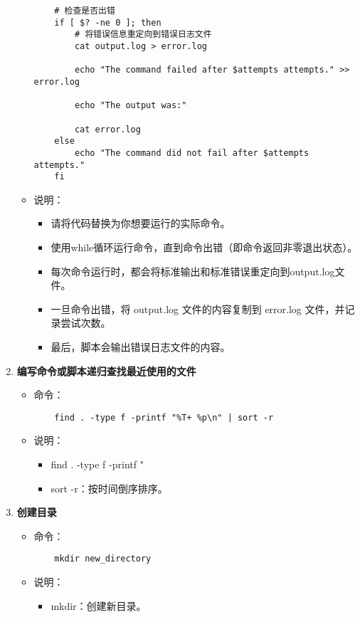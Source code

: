 \documentclass[UTF8]{ctexart}
\begin{document}
\begin{enumerate}
\begin{itemize}
\begin{verbatim}
    # 检查是否出错
    if [ $? -ne 0 ]; then
        # 将错误信息重定向到错误日志文件
        cat output.log > error.log

        echo "The command failed after $attempts attempts." >> error.log

        echo "The output was:"

        cat error.log
    else
        echo "The command did not fail after $attempts attempts."
    fi
    \end{verbatim}
    \item 说明：
    \begin{itemize}
      \item 请将代码替换为你想要运行的实际命令。
      \item 使用while循环运行命令，直到命令出错（即命令返回非零退出状态）。
      \item 每次命令运行时，都会将标准输出和标准错误重定向到output.log文件。
      \item 一旦命令出错，将 output.log 文件的内容复制到 error.log 文件，并记录尝试次数。
      \item 最后，脚本会输出错误日志文件的内容。
    \end{itemize}
  \end{itemize}

  \item \textbf{编写命令或脚本递归查找最近使用的文件}
  \begin{itemize}
    \item 命令：
    \begin{verbatim}
    find . -type f -printf "%T+ %p\n" | sort -r
    \end{verbatim}
    \item 说明：
    \begin{itemize}
      \item find . -type f -printf "%
      \item sort -r：按时间倒序排序。
    \end{itemize}
  \end{itemize}

  \item \textbf{创建目录}
  \begin{itemize}
    \item 命令：
    \begin{verbatim}
    mkdir new_directory
    \end{verbatim}
    \item 说明：
    \begin{itemize}
      \item mkdir：创建新目录。
    \end{itemize}
  \end{itemize}


\end{enumerate}
\end{document}
